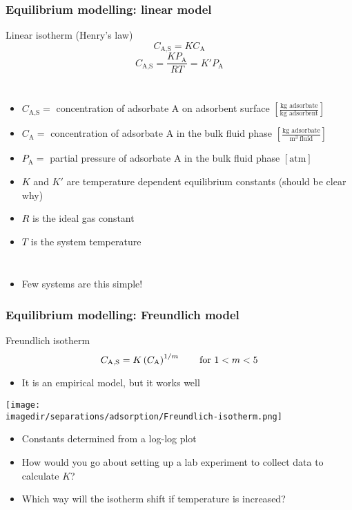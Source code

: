 \begin{frame}\frametitle{Equilibrium modelling: linear model}
	\begin{exampleblock}{Linear isotherm (Henry's law)}
		\[C_\text{A,S} = K C_\text{A}\]
		\[C_\text{A,S} = \frac{K P_\text{A}}{RT} = K' P_\text{A}\]
	\end{exampleblock}
	\begin{columns}[t]
			\begin{itemize}
				\item	{\small $C_\text{A,S} =$ concentration of adsorbate A on adsorbent surface \hfill $\left[\displaystyle \frac{\text{kg adsorbate}}{\text{kg adsorbent}}\right]$}
				\item	{\small $C_\text{A} =$ concentration of adsorbate A in the bulk fluid phase \hfill $\left[\displaystyle \frac{\text{kg adsorbate}}{\text{m}^3~ \text{fluid}}\right]$}
				\item	{\small $P_\text{A} =$ partial pressure of adsorbate A in the bulk fluid phase \hfill $\left[ \text{atm}\right]\,$}
				\item	{\small $K$ and $K'$ are temperature dependent equilibrium constants {\tiny (should be clear why)}}
				\item	{\small $R$ is the ideal gas constant}
				\item	{\small $T$ is the system temperature}
			\end{itemize}
	\end{columns}
	\vspace{12pt}
	\begin{itemize}
		\item	Few systems are this simple!
	\end{itemize}
\end{frame}

\begin{frame}\frametitle{Equilibrium modelling: Freundlich model}
	\begin{exampleblock}{Freundlich isotherm}
		\[C_\text{A,S} = K \left(C_\text{A}\right)^{1/m}\qquad \text{for $ 1 < m < 5$}\]
	\end{exampleblock}

	\vspace{12pt}
	\begin{itemize}
		\item	It is an empirical model, but it works well
	\end{itemize}
	\begin{center}
		\texttt{[image: \\imagedir/separations/adsorption/Freundlich-isotherm.png]}
	\end{center}

	\begin{itemize}
		\item	Constants determined from a log-log plot
		\item	How would you go about setting up a lab experiment to collect data to calculate $K$?
		\item	Which way will the isotherm shift if temperature is increased?
	\end{itemize}
\end{frame}

